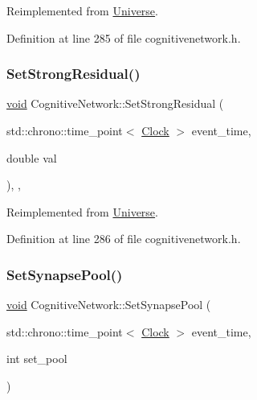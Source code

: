 Reimplemented from \mbox{\hyperlink{class_universe_aafec97a231126b71c73ac1258609a284}{Universe}}.



Definition at line 285 of file cognitivenetwork.\+h.

\mbox{\label{class_cognitive_network_a6f7210dd8c2786518329faa61b6e14d5}} 
\subsubsection{\texorpdfstring{Set\+Strong\+Residual()}{SetStrongResidual()}}
{\footnotesize\ttfamily \mbox{\hyperlink{glad_8h_a950fc91edb4504f62f1c577bf4727c29}{void}} Cognitive\+Network\+::\+Set\+Strong\+Residual (\begin{DoxyParamCaption}\item[{std\+::chrono\+::time\+\_\+point$<$ \mbox{\hyperlink{universe_8h_a0ef8d951d1ca5ab3cfaf7ab4c7a6fd80}{Clock}} $>$}]{event\+\_\+time,  }\item[{double}]{val }\end{DoxyParamCaption})\hspace{0.3cm}{\ttfamily [inline]}, {\ttfamily [final]}, {\ttfamily [virtual]}}



Reimplemented from \mbox{\hyperlink{class_universe_a1b2d6197ddf3d613cc30bd04d22ed8b7}{Universe}}.



Definition at line 286 of file cognitivenetwork.\+h.

\mbox{\label{class_cognitive_network_a9d2b7d1de9e7148a403fc15f7f3fd1bf}} 
\subsubsection{\texorpdfstring{Set\+Synapse\+Pool()}{SetSynapsePool()}}
{\footnotesize\ttfamily \mbox{\hyperlink{glad_8h_a950fc91edb4504f62f1c577bf4727c29}{void}} Cognitive\+Network\+::\+Set\+Synapse\+Pool (\begin{DoxyParamCaption}\item[{std\+::chrono\+::time\+\_\+point$<$ \mbox{\hyperlink{universe_8h_a0ef8d951d1ca5ab3cfaf7ab4c7a6fd80}{Clock}} $>$}]{event\+\_\+time,  }\item[{int}]{set\+\_\+pool }\end{DoxyParamCaption})\hspace{0.3cm}{\ttfamily [inline]}}



